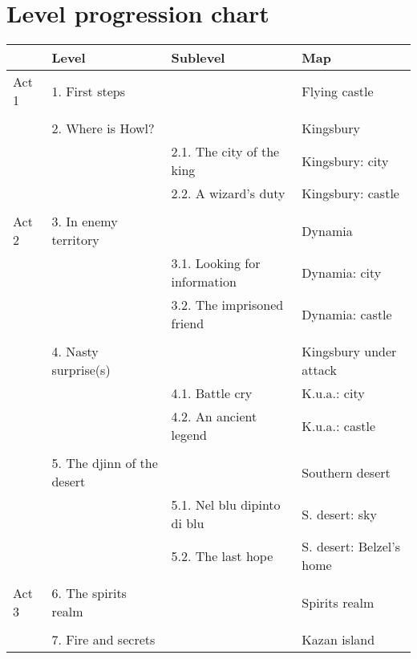 \section{Level progression chart}

\begin{longtable}[H]{|p{2cm}|p{3cm}|p{3cm}|p{3cm}|}
\hline
\rowcolor[HTML]{C0C0C0} 
\multicolumn{1}{|l|}{\cellcolor[HTML]{C0C0C0}\textbf{Story act}} & \multicolumn{1}{l|}{\cellcolor[HTML]{C0C0C0}\textbf{Level}} & \multicolumn{1}{l|}{\cellcolor[HTML]{C0C0C0}\textbf{Sublevel}} & \textbf{Map} \\ \hline
\multicolumn{1}{|l|}{\cellcolor[HTML]{C0C0C0}Act 1} & \multicolumn{1}{l|}{1. First steps} & \multicolumn{1}{l|}{} & Flying castle \\ \hline
\multicolumn{1}{|l|}{} &  &  &  \\ \cline{2-4} 
 & \multicolumn{1}{l|}{2. Where is Howl?} & \multicolumn{1}{l|}{} & Kingsbury \\ \cline{2-4} 
 & \multicolumn{1}{l|}{} & \multicolumn{1}{l|}{2.1. The city of the king} & Kingsbury: city \\ \cline{3-4} 
 & \multicolumn{1}{l|}{} & \multicolumn{1}{l|}{2.2. A wizard's duty} & Kingsbury: castle \\ \hline
\multicolumn{4}{|l|}{} \\ \hline
\multicolumn{1}{|l|}{\cellcolor[HTML]{C0C0C0}Act 2} & \multicolumn{1}{l|}{3. In enemy territory} & \multicolumn{1}{l|}{} & Dynamia \\ \hline
 & \multicolumn{1}{l|}{} & \multicolumn{1}{l|}{3.1. Looking for information} & Dynamia: city \\ \cline{3-4} 
 & \multicolumn{1}{l|}{} & \multicolumn{1}{l|}{3.2. The imprisoned friend} & Dynamia: castle \\ \cline{2-4} 
 &  &  &  \\ \cline{2-4} 
 & \multicolumn{1}{l|}{4. Nasty surprise(s)} & \multicolumn{1}{l|}{} & Kingsbury under attack \\ \cline{2-4} 
 & \multicolumn{1}{l|}{} & \multicolumn{1}{l|}{4.1. Battle cry} & K.u.a.: city \\ \cline{3-4} 
 & \multicolumn{1}{l|}{} & \multicolumn{1}{l|}{4.2. An ancient legend} & K.u.a.: castle \\ \cline{2-4} 
 &  &  &  \\ \cline{2-4} 
 & \multicolumn{1}{l|}{5. The djinn of the desert} & \multicolumn{1}{l|}{} & Southern desert \\ \cline{2-4} 
 & \multicolumn{1}{l|}{} & \multicolumn{1}{l|}{5.1. Nel blu dipinto di blu} & S. desert: sky \\ \cline{3-4} 
 & \multicolumn{1}{l|}{} & \multicolumn{1}{l|}{5.2. The last hope} & S. desert: Belzel's home \\ \hline
\multicolumn{4}{|l|}{} \\ \hline
\multicolumn{1}{|l|}{\cellcolor[HTML]{C0C0C0}Act 3} & \multicolumn{1}{l|}{6. The spirits realm} & \multicolumn{1}{l|}{} & Spirits realm \\ \hline
 &  &  &  \\ \cline{2-4} 
 & \multicolumn{1}{l|}{7. Fire and secrets} & \multicolumn{1}{l|}{} & Kazan island \\ \hline


\end{longtable}
